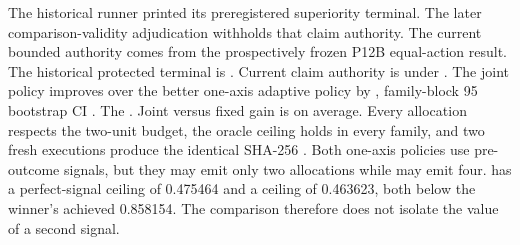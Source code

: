\markdownRendererDocumentBegin
\markdownRendererSectionBegin
{}\markdownRendererInterblockSeparator
{}The historical runner printed its preregistered superiority terminal. The later comparison-validity adjudication withholds that claim authority. The current bounded authority comes from the prospectively frozen P12B equal-action result. The historical protected terminal is . Current claim authority is  under .\markdownRendererInterblockSeparator
{}\markdownRendererInterblockSeparator
{}The joint policy improves over the better one-axis adaptive policy by , family-block 95\markdownRendererPercentSign{} bootstrap CI \markdownRendererStrongEmphasis{\markdownRendererCodeSpan{[0.286008, 0.382693]}}.\markdownRendererInterblockSeparator
{}The . Joint versus fixed  gain is  on average. Every allocation respects the two-unit budget, the oracle ceiling holds in every family, and two fresh executions produce the identical SHA-256\markdownRendererInterblockSeparator
{}.\markdownRendererInterblockSeparator
{}\markdownRendererSectionBegin
{}\markdownRendererInterblockSeparator
{}Both one-axis policies use pre-outcome signals, but they may emit only two allocations while  may emit four.  has a perfect-signal ceiling of 0.475464 and  a ceiling of 0.463623, both below the winner's achieved 0.858154. The comparison therefore does not isolate the value of a second signal.\markdownRendererInterblockSeparator
